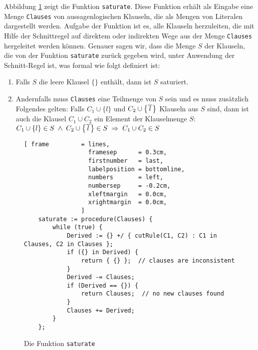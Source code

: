 Abbildung \ref{fig:completeness.stlx-2} zeigt die Funktion \texttt{saturate}.  Diese Funktion erhält
als Eingabe eine Menge \texttt{Clauses} von aus\-sagenlogischen Klauseln, die als Mengen von Literalen
dargestellt werden.  Aufgabe der Funktion ist es, alle Klauseln herzuleiten, die mit Hilfe der
Schnittregel auf direktem oder indirekten Wege aus der Menge \texttt{Clauses} hergeleitet werden
können.  Genauer sagen wir, dass die Menge $S$ der Klauseln, die von der Funktion \texttt{saturate}
zurück gegeben wird, unter Anwendung der Schnitt-Regel  ist, was formal wie folgt
definiert ist:
\begin{enumerate}
\item Falls $S$ die leere Klausel $\{\}$ enthält, dann ist $S$ saturiert.
\item Andernfalls muss \texttt{Clauses} eine Teilmenge von $S$ sein und es muss zusätzlich Folgendes
      gelten: Falls $C_1 \cup \{ l \}$ und  $C_2 \cup \bigl\{ \overline{\,l\,} \bigr\}$ Klauseln aus $S$
      sind, dann ist auch die Klausel $C_1 \cup C_2$ ein Element der Klausel\-menge $S$:
      \\[0.2cm]
      \hspace*{1.3cm}
      $C_1 \cup \{ l \} \in S \;\wedge\; C_2 \cup \bigl\{ \overline{\,l\,} \bigr\} \in S \;\Rightarrow\; C_1 \cup C_2 \in S$ 
\end{enumerate}
\begin{figure}[!ht]
\centering
\begin{Verbatim}[ frame         = lines, 
                  framesep      = 0.3cm, 
                  firstnumber   = last,
                  labelposition = bottomline,
                  numbers       = left,
                  numbersep     = -0.2cm,
                  xleftmargin   = 0.0cm,
                  xrightmargin  = 0.0cm,
                ]
    saturate := procedure(Clauses) {
        while (true) {
            Derived := {} +/ { cutRule(C1, C2) : C1 in Clauses, C2 in Clauses };
            if ({} in Derived) {
                return { {} };  // clauses are inconsistent
            }
            Derived -= Clauses;
            if (Derived == {}) {
                return Clauses;  // no new clauses found
            }
            Clauses += Derived;
        }
    };
\end{Verbatim}
\vspace*{-0.3cm}
\caption{Die Funktion \texttt{saturate}}
\label{fig:completeness.stlx-2}
\end{figure}

